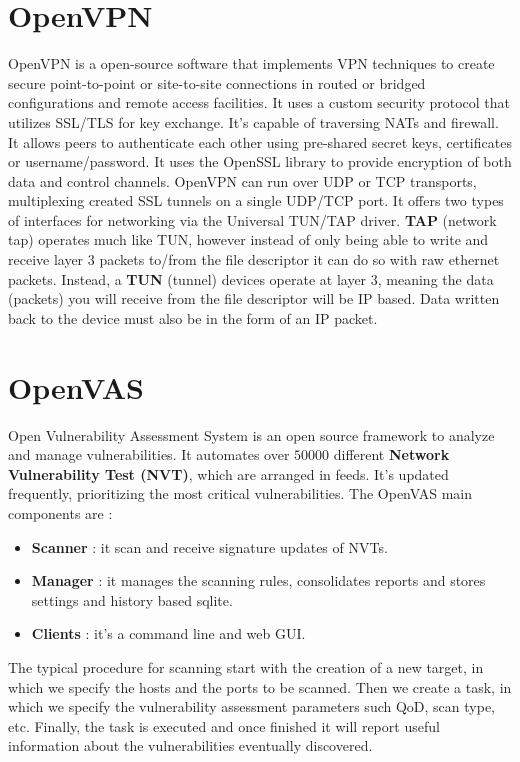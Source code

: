 \documentclass[11pt]{article}
\begin{document}
\begin{appendices}
\section{OpenVPN}
OpenVPN is a open-source software that implements VPN techniques to create secure point-to-point or site-to-site connections in routed or bridged configurations and remote access facilities. It uses a custom security protocol that utilizes SSL/TLS for key exchange. It's capable of traversing NATs and firewall. It allows peers to authenticate each other using pre-shared secret keys, certificates or username/password. It uses the OpenSSL library to provide encryption of both data and control channels. OpenVPN can run over UDP or TCP transports, multiplexing created SSL tunnels on a single UDP/TCP port. It offers two types of interfaces for networking via the Universal TUN/TAP driver. \textbf{TAP} (network tap) operates much like TUN, however instead of only being able to write and receive layer $3$ packets to/from the file descriptor it can do so with raw ethernet packets. Instead, a \textbf{TUN} (tunnel) devices operate at layer $3$, meaning the data (packets) you will receive from the file descriptor will be IP based. Data written back to the device must also be in the form of an IP packet.
\section{OpenVAS}
Open Vulnerability Assessment System is an open source framework to analyze and manage vulnerabilities. It automates over $50000$ different \textbf{Network Vulnerability Test (NVT)}, which are arranged in feeds. It's updated frequently, prioritizing the most critical vulnerabilities. The OpenVAS main components are :
\begin{itemize}
\item \textbf{Scanner} : it scan and receive signature updates of NVTs.
\item \textbf{Manager} : it manages the scanning rules, consolidates reports and stores settings and history based sqlite.
\item \textbf{Clients} : it's a command line and web GUI.
\end{itemize}
The typical procedure for scanning start with the creation of a new target, in which we specify the hosts and the ports to be scanned. Then we create a task, in which we specify the vulnerability assessment parameters such QoD, scan type, etc. Finally, the task is executed and once finished it will report useful information about the vulnerabilities eventually discovered.
\end{appendices}
\end{document}
